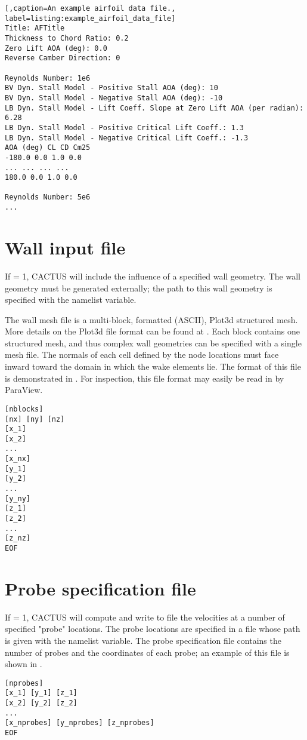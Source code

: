 \begin{lstlisting}[,caption=An example airfoil data file., label=listing:example_airfoil_data_file]
Title: AFTitle
Thickness to Chord Ratio: 0.2
Zero Lift AOA (deg): 0.0
Reverse Camber Direction: 0

Reynolds Number: 1e6
BV Dyn. Stall Model - Positive Stall AOA (deg): 10
BV Dyn. Stall Model - Negative Stall AOA (deg): -10
LB Dyn. Stall Model - Lift Coeff. Slope at Zero Lift AOA (per radian): 6.28
LB Dyn. Stall Model - Positive Critical Lift Coeff.: 1.3
LB Dyn. Stall Model - Negative Critical Lift Coeff.: -1.3
AOA (deg) CL CD Cm25
-180.0 0.0 1.0 0.0
... ... ... ...
180.0 0.0 1.0 0.0

Reynolds Number: 5e6
... 
\end{lstlisting}


\section{Wall input file}
If  = 1, CACTUS will include the influence of a specified wall geometry. The wall geometry must be generated externally; the path to this wall geometry is specified with the  namelist variable.

The wall mesh file is a multi-block, formatted (ASCII), Plot3d structured mesh. More details on the Plot3d file format can be found at . Each block contains one structured mesh, and thus complex wall geometries can be specified with a single mesh file. The normals of each cell defined by the node locations must face inward toward the domain in which the wake elements lie. The format of this file is demonstrated in . For inspection, this file format may easily be read in by ParaView.

\begin{lstlisting}[label=listing:plot3d_file_example,caption=Format for a multi-block Plot3d mesh file.]
[nblocks]
[nx] [ny] [nz]
[x_1]
[x_2]
...
[x_nx]
[y_1]
[y_2]
...
[y_ny]
[z_1]
[z_2]
...
[z_nz]
EOF
\end{lstlisting}

\section{Probe specification file}
If  = 1, CACTUS will compute and write to file the velocities at a number of specified "probe" locations. The probe locations are specified in a file whose path is given with the  namelist variable. The probe specification file contains the number of probes and the coordinates of each probe; an example of this file is shown in .

\begin{lstlisting}[label=listing:probespec_file_example,caption=Format for the probe specification file.]
[nprobes]
[x_1] [y_1] [z_1]
[x_2] [y_2] [z_2]
...
[x_nprobes] [y_nprobes] [z_nprobes]
EOF
\end{lstlisting}
